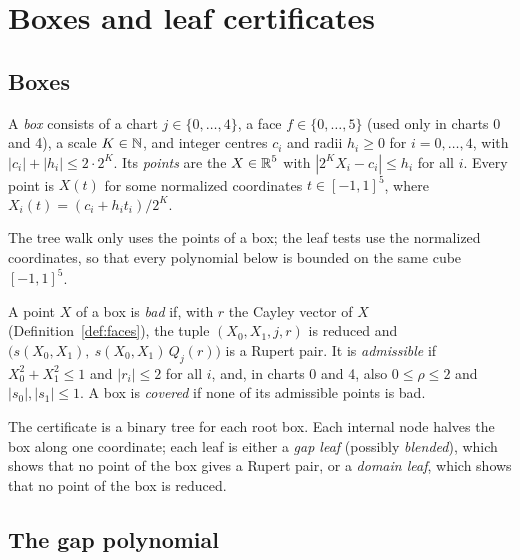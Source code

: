 \chapter{Boxes and leaf certificates}
\label{chap:certificates}

\section{Boxes}

\begin{definition}
\label{def:box}
\leanok
{}
A \emph{box} consists of a chart $j \in \{0, \dots, 4\}$, a face $f \in \{0, \dots, 5\}$
(used only in charts 0 and 4), a scale $K \in \operatorname{\mathbb{N}}$, and integer centres $c_i$ and radii
$h_i \ge 0$ for $i = 0, \dots, 4$, with $|c_i| + |h_i| \le 2 \cdot 2^K$. Its \emph{points}
are the $X \in \operatorname{\mathbb{R}}^5$ with $|2^K X_i - c_i| \le h_i$ for all $i$. Every point is $X(t)$ for
some normalized coordinates $t \in [-1,1]^5$, where $X_i(t) = (c_i + h_i t_i) / 2^K$.
\end{definition}

The tree walk only uses the points of a box; the leaf tests use the normalized
coordinates, so that every polynomial below is bounded on the same cube $[-1,1]^5$.

\begin{definition}
\label{def:bad}
\leanok
{}
A point $X$ of a box is \emph{bad} if, with $r$ the Cayley vector of $X$
(Definition~\ref{def:faces}), the tuple $(X_0, X_1, j, r)$ is reduced and
$\bigl(s(X_0, X_1),\ s(X_0, X_1)\, Q_j(r)\bigr)$ is a Rupert pair. It is
\emph{admissible} if $X_0^2 + X_1^2 \le 1$ and $|r_i| \le 2$ for all $i$, and, in
charts 0 and 4, also $0 \le \rho \le 2$ and $|s_0|, |s_1| \le 1$. A box is
\emph{covered} if none of its admissible points is bad.
\end{definition}

The certificate is a binary tree for each root box. Each internal node halves the box
along one coordinate; each leaf is either a \emph{gap leaf} (possibly \emph{blended}), which shows that no
point of the box gives a Rupert pair, or a \emph{domain leaf}, which shows that no point
of the box is reduced.

\section{The gap polynomial}

